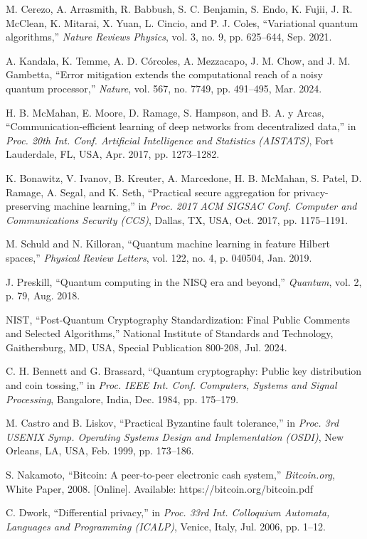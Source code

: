 \documentclass[10pt,journal,compsoc]{IEEEtran}
\begin{document}
\begin{thebibliography}{30}
M. Cerezo, A. Arrasmith, R. Babbush, S. C. Benjamin, S. Endo, K. Fujii, J. R. McClean, K. Mitarai, X. Yuan, L. Cincio, and P. J. Coles, ``Variational quantum algorithms,'' \textit{Nature Reviews Physics}, vol. 3, no. 9, pp. 625--644, Sep. 2021.

A. Kandala, K. Temme, A. D. Córcoles, A. Mezzacapo, J. M. Chow, and J. M. Gambetta, ``Error mitigation extends the computational reach of a noisy quantum processor,'' \textit{Nature}, vol. 567, no. 7749, pp. 491--495, Mar. 2024.

H. B. McMahan, E. Moore, D. Ramage, S. Hampson, and B. A. y Arcas, ``Communication-efficient learning of deep networks from decentralized data,'' in \textit{Proc. 20th Int. Conf. Artificial Intelligence and Statistics (AISTATS)}, Fort Lauderdale, FL, USA, Apr. 2017, pp. 1273--1282.

K. Bonawitz, V. Ivanov, B. Kreuter, A. Marcedone, H. B. McMahan, S. Patel, D. Ramage, A. Segal, and K. Seth, ``Practical secure aggregation for privacy-preserving machine learning,'' in \textit{Proc. 2017 ACM SIGSAC Conf. Computer and Communications Security (CCS)}, Dallas, TX, USA, Oct. 2017, pp. 1175--1191.

M. Schuld and N. Killoran, ``Quantum machine learning in feature Hilbert spaces,'' \textit{Physical Review Letters}, vol. 122, no. 4, p. 040504, Jan. 2019.

J. Preskill, ``Quantum computing in the NISQ era and beyond,'' \textit{Quantum}, vol. 2, p. 79, Aug. 2018.

NIST, ``Post-Quantum Cryptography Standardization: Final Public Comments and Selected Algorithms,'' National Institute of Standards and Technology, Gaithersburg, MD, USA, Special Publication 800-208, Jul. 2024.

C. H. Bennett and G. Brassard, ``Quantum cryptography: Public key distribution and coin tossing,'' in \textit{Proc. IEEE Int. Conf. Computers, Systems and Signal Processing}, Bangalore, India, Dec. 1984, pp. 175--179.

M. Castro and B. Liskov, ``Practical Byzantine fault tolerance,'' in \textit{Proc. 3rd USENIX Symp. Operating Systems Design and Implementation (OSDI)}, New Orleans, LA, USA, Feb. 1999, pp. 173--186.

S. Nakamoto, ``Bitcoin: A peer-to-peer electronic cash system,'' \textit{Bitcoin.org}, White Paper, 2008. [Online]. Available: https://bitcoin.org/bitcoin.pdf

C. Dwork, ``Differential privacy,'' in \textit{Proc. 33rd Int. Colloquium Automata, Languages and Programming (ICALP)}, Venice, Italy, Jul. 2006, pp. 1--12.

\end{thebibliography}
\end{document}
